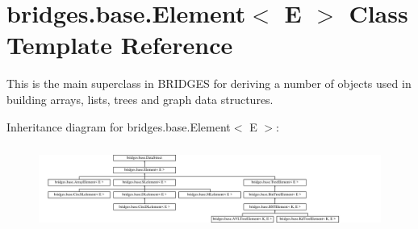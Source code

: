 \hypertarget{classbridges_1_1base_1_1_element}{}\section{bridges.\+base.\+Element$<$ E $>$ Class Template Reference}
\label{classbridges_1_1base_1_1_element}


This is the main superclass in B\+R\+I\+D\+G\+ES for deriving a number of objects used in building arrays, lists, trees and graph data structures.  


Inheritance diagram for bridges.\+base.\+Element$<$ E $>$\+:\begin{figure}[H]
\begin{center}
\leavevmode
\includegraphics[height=2.788382cm]{classbridges_1_1base_1_1_element}
\end{center}
\end{figure}
